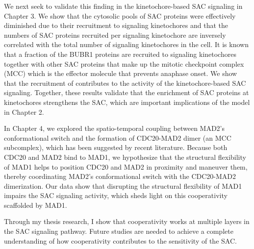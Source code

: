 We next seek to validate this finding in the kinetochore-based SAC signaling in Chapter 3. We show that the cytosolic pools of SAC proteins were effectively diminished due to their recruitment to signaling kinetochores and that the numbers of SAC proteins recruited per signaling kinetochore are inversely correlated with the total number of signaling kinetochores in the cell. It is known that a fraction of the BUBR1 proteins are recruited to signaling kinetochores together with other SAC proteins that make up the mitotic checkpoint complex (MCC) which is the effector molecule that prevents anaphase onset. We show that the recruitment of   contributes to the activity of the kinetochore-based SAC signaling. Together, these results validate that the enrichment of SAC proteins at kinetochores strengthens the SAC, which are important implications of the model in Chapter 2.

In Chapter 4, we explored the spatio-temporal coupling between MAD2's conformational switch and the formation of CDC20-MAD2 dimer (an MCC subcomplex), which has been suggested by recent literature. Because both CDC20 and MAD2 bind to MAD1, we hypothesize that the structural flexibility of MAD1 helps to position CDC20 and MAD2 in proximity and maneuver them, thereby coordinating MAD2's conformational switch with the CDC20-MAD2 dimerization. Our data show that disrupting the structural flexibility of MAD1 impairs the SAC signaling activity, which sheds light on this cooperativity scaffolded by MAD1.

Through my thesis research, I show that cooperativity works at multiple layers in the SAC signaling pathway. Future studies are needed to achieve a complete understanding of how cooperativity contributes to the sensitivity of the SAC.